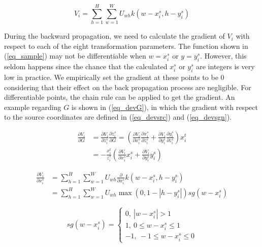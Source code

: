 \documentclass[10pt,twocolumn,letterpaper]{article}
\begin{document}
\begin{equation}\label{eq_sample}
V_i = \sum_{h=1}^{H} \sum_{w=1}^{W} U_{wh} k(w-x_i^s,h-y_i^s) 
\end{equation}

During the backward propagation, we need to calculate the gradient of $V_i$ with respect to each of the eight transformation parameters. The function shown in (\ref{eq_sample}) may not be differentiable when $w=x_i^s$ or $y=y_i^s$. However, this seldom happens since the chance that the calculated $x_i^s$ or $y_i^s$ are integers is very low in practice. We empirically set the gradient at these points to be $0$ considering that their effect on the back propagation process are negligible. For differentiable points, the chain rule can be applied to get the gradient. An example regarding $G$ is shown in (\ref{eq_devG}), in which the gradient with respect to the source coordinates are defined in (\ref{eq_devsrc}) and (\ref{eq_devsgn}). 

	\begin{equation}\label{eq_devG}
	\begin{split}
	\frac{\partial V_i}{\partial G} &= \frac{\partial V_i}{\partial z_i^s} \frac{\partial z_i^s}{\partial G} 
	= \left(\frac{\partial V_i}{\partial x_i^s} \frac{\partial x_i^s}{\partial z_i^s} + \frac{\partial V_i}{\partial y_i^s} \frac{\partial y_i^s}{\partial z_i^s}\right) x_i^t \\
	&=-\frac{x_i^t}{z_i^s}\left(\frac{\partial V_i}{\partial x_i^s} x_i^s + \frac{\partial V_i}{\partial y_i^s} y_i^s\right)
	\end{split}
	\end{equation}
	
	\begin{equation}\label{eq_devsrc}
	\begin{split}
	\frac{\partial V_i}{\partial x_i^s}
	&= \sum_{h=1}^{H} \sum_{w=1}^{W} U_{wh} \frac{\partial}{\partial x_i^s}k(w-x_i^s,h-y_i^s) \\
	&= \sum_{h=1}^{H} \sum_{w=1}^{W} U_{wh} \max(0,1-|h-y_i^s|) sg(w-x_i^s)
	\end{split}
	\end{equation}
	
	\begin{equation}\label{eq_devsgn}
	sg(w-x_i^s) = 	\left\{                 
	\begin{array}{lll}  
		0, \ |w-x_i^s|>1 \\ 
		1, \ 0 \leq w-x_i^s \leq 1 \\
		-1, \ -1 \leq w-x_i^s \leq 0
	\end{array}       
	\right. 
	\end{equation}
\end{document}
